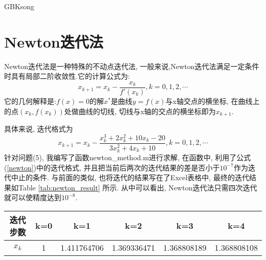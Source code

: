 \documentclass[a4paper]{article}
\begin{document}
\begin{CJK*}{GBK}{song}
\begin{center}
\begin{table*}[!htbp]
%
\end{table*}
\end{center}

\section{Newton迭代法}
Newton迭代法是一种特殊的不动点迭代法, 一般来说,Newton迭代法满足一定条件时具有局部二阶收敛性.它的计算公式为:
\begin{equation}\label{newton}
x_{k+1}=x_k-\frac{x_k}{f'(x_k)}, k=0, 1, 2, \cdots
\end{equation}
它的几何解释是:$f(x)=0$的解$x^*$是曲线$y=f(x)$与x轴交点的横坐标, 在曲线上的点$(x_k, f(x_k))$处做曲线的切线, 切线与x轴的交点的横坐标即为$x_{k+1}$.\par

具体来说, 迭代格式为
\begin{equation}\label{newton_spe}
x_{k+1}=x_k-\frac{x_k^3+2x_k^2+10x_k-20}{3x_k^2+4x_k+10}, k=0, 1, 2, \cdots
\end{equation}
针对问题(5), 我编写了函数newton\_method.m进行求解, 在函数中, 利用了公式(\ref{newton})中的迭代格式, 并且把当前后两次的迭代结果的差是否小于$10^{-7}$作为迭代中止的条件. 与前面的类似, 也将迭代的结果写在了Excel表格中, 最终的迭代结果如Table \ref{tab:newton_result} 所示. 从中可以看出, Newton迭代法只需四次迭代就可以使精度达到$10^{-8}$.

\begin{table*}[!htbp]
\centering
\begin{threeparttable}[!htpb]
 \caption{\label{tab:newton_result}采用Newton迭代方法后的迭代结果}
 \begin{tabular}{ccccc c}
 \toprule
 迭代步数 &k=0 & k=1	&k=2	&	k=3	&	k=4	\\ \hline
$x_k$ &1&1.411764706&1.369336471	&1.368808189&	1.368808108\\
\bottomrule
\end{tabular}
\end{threeparttable}%
\end{table*}



\end{CJK*}
\end{document}

